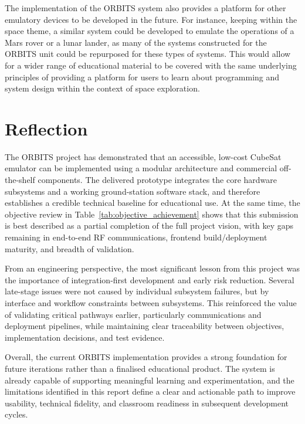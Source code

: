\documentclass[a4paper,12pt,titlepage]{report}
\begin{document}
The implementation of the ORBITS system also provides a platform for other emulatory devices to be developed in the future. For instance, keeping within the space theme, a similar system could be developed to emulate the operations of a Mars rover or a lunar lander, as many of the systems constructed for the ORBITS unit could be repurposed for these types of systems. This would allow for a wider range of educational material to be covered with the same underlying principles of providing a platform for users to learn about programming and system design within the context of space exploration.

\section{Reflection}

The ORBITS project has demonstrated that an accessible, low-cost CubeSat emulator can be implemented using a modular architecture and commercial off-the-shelf components. The delivered prototype integrates the core hardware subsystems and a working ground-station software stack, and therefore establishes a credible technical baseline for educational use. At the same time, the objective review in Table~\ref{tab:objective_achievement} shows that this submission is best described as a partial completion of the full project vision, with key gaps remaining in end-to-end RF communications, frontend build/deployment maturity, and breadth of validation.

From an engineering perspective, the most significant lesson from this project was the importance of integration-first development and early risk reduction. Several late-stage issues were not caused by individual subsystem failures, but by interface and workflow constraints between subsystems. This reinforced the value of validating critical pathways earlier, particularly communications and deployment pipelines, while maintaining clear traceability between objectives, implementation decisions, and test evidence.

Overall, the current ORBITS implementation provides a strong foundation for future iterations rather than a finalised educational product. The system is already capable of supporting meaningful learning and experimentation, and the limitations identified in this report define a clear and actionable path to improve usability, technical fidelity, and classroom readiness in subsequent development cycles.

\printbibliography[heading=bibintoc]
\newpage
\appendix
\end{document}
